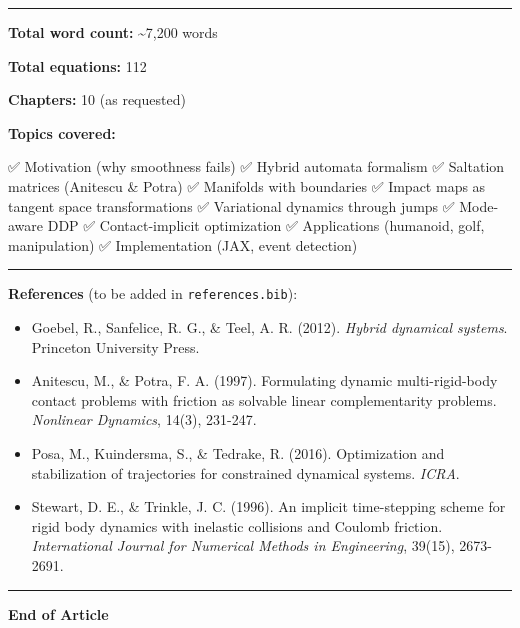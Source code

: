 \documentclass[
  letterpaper,
  DIV=11,
  numbers=noendperiod]{scrartcl}
\providecommand{\tightlist}{%
  \setlength{\itemsep}{0pt}\setlength{\parskip}{0pt}}\usepackage{longtable,booktabs,array}
\begin{document}
\begin{center}\rule{0.5\linewidth}{0.5pt}\end{center}

\textbf{Total word count:} \textasciitilde7,200 words

\textbf{Total equations:} 112

\textbf{Chapters:} 10 (as requested)

\textbf{Topics covered:}

✅ Motivation (why smoothness fails) ✅ Hybrid automata formalism ✅
Saltation matrices (Anitescu \& Potra) ✅ Manifolds with boundaries ✅
Impact maps as tangent space transformations ✅ Variational dynamics
through jumps ✅ Mode-aware DDP ✅ Contact-implicit optimization ✅
Applications (humanoid, golf, manipulation) ✅ Implementation (JAX,
event detection)

\begin{center}\rule{0.5\linewidth}{0.5pt}\end{center}

\textbf{References} (to be added in \texttt{references.bib}):

\begin{itemize}
\tightlist
\item
  Goebel, R., Sanfelice, R. G., \& Teel, A. R. (2012). \emph{Hybrid
  dynamical systems}. Princeton University Press.
\item
  Anitescu, M., \& Potra, F. A. (1997). Formulating dynamic
  multi-rigid-body contact problems with friction as solvable linear
  complementarity problems. \emph{Nonlinear Dynamics}, 14(3), 231-247.
\item
  Posa, M., Kuindersma, S., \& Tedrake, R. (2016). Optimization and
  stabilization of trajectories for constrained dynamical systems.
  \emph{ICRA}.
\item
  Stewart, D. E., \& Trinkle, J. C. (1996). An implicit time-stepping
  scheme for rigid body dynamics with inelastic collisions and Coulomb
  friction. \emph{International Journal for Numerical Methods in
  Engineering}, 39(15), 2673-2691.
\end{itemize}

\begin{center}\rule{0.5\linewidth}{0.5pt}\end{center}

\textbf{End of Article}
\end{document}
